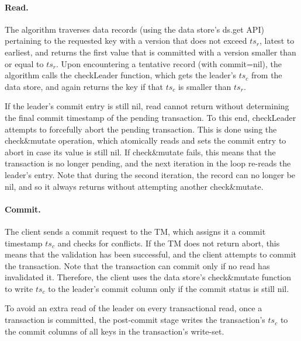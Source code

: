 \paragraph{Read.}
The algorithm traverses data  records (using the data store's ds.get API) pertaining
to the requested key with a version that does not exceed $ts_r$, latest to earliest, and returns the first value that is committed
with a  version smaller than or equal to $ts_r$. Upon
encountering a tentative record (with commit=nil), the algorithm calls the {\sc checkLeader} function, which
gets the leader's $ts_c$ from the data store, and again returns the key if that $ts_c$ is smaller than $ts_r$. 

If the leader's commit entry is still nil, read cannot return without determining the final commit timestamp
of the pending transaction. 
To this end, {\sc checkLeader} attempts to forcefully abort the pending transaction. This is done using the
 {check\&mutate} operation, which atomically reads and sets the commit entry to abort in case its value is still nil.
If check\&mutate fails, this means that the transaction is no longer pending, and the next iteration in the loop 
re-reads the leader's entry. Note that during the second iteration, the record can no longer be nil, and so it
always returns without attempting another check\&mutate.
 


\paragraph{Commit.}
The client sends a commit request to the TM, which assigns it a commit timestamp $ts_c$ and checks for conflicts. 
If the TM does not return abort, this means that the validation has been successful, and the client 
attempts to commit the transaction. 
Note that the transaction can commit only if no read has invalidated it. Therefore, the client uses 
the data store's check\&mutate function to write $ts_c$ to the leader's commit column 
only if the commit status is still nil.

To avoid an extra read of the leader on every transactional read, once a transaction is committed, the post-commit stage writes 
the transaction's $ts_c$ to the commit columns of all keys in  the transaction's write-set. 

